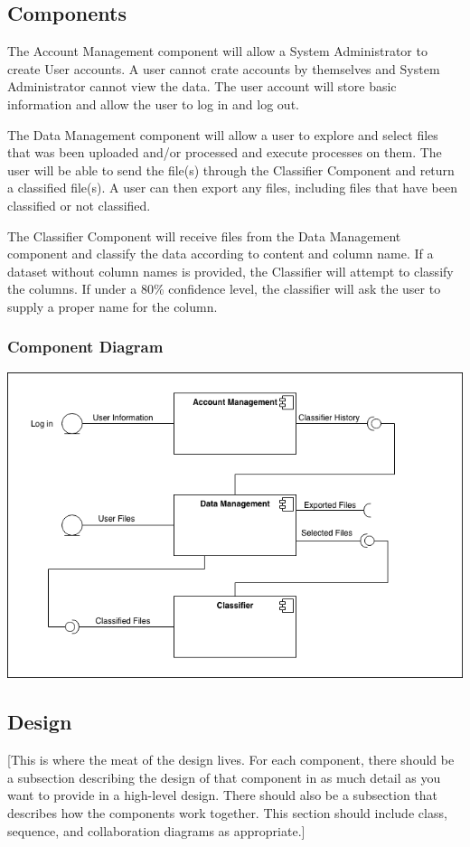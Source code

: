 \documentclass[12pt,oneside,letterpaper]{article}
\begin{document}
\subsection{Components}
The Account Management component will allow a System Administrator to create User accounts. A user cannot crate accounts by themselves and System Administrator cannot view the data. The user account will store basic information and allow the user to log in and log out.

The Data Management component will allow a user to explore and select files that was been uploaded and/or processed and execute processes on them. The user will be able to send the file(s) through the Classifier Component and return a classified file(s). A user can then export any files, including files that have been classified or not classified.

The Classifier Component will receive files from the Data Management component and classify the data according to content and column name. If a dataset without column names is provided, the Classifier will attempt to classify the columns. If under a 80\% confidence level, the classifier will ask the user to supply a proper name for the column.
\subsubsection{Component Diagram}
\includegraphics[scale = 0.7]{Component_Diagram.png}
\begingroup
{}
\endgroup


\subsection{Design}
[This is where the meat of the design lives.  For each component, there should be a subsection describing the design of that component in as much detail as you want to provide in a high-level design.  There should also be a subsection that describes how the components work together. This section should include class, sequence, and collaboration diagrams as appropriate.]
\end{document}
